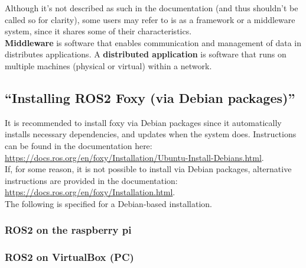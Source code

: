 \documentclass[a4paper, 10pt]{article}
\begin{document}
        Although it’s not described as such in the documentation (and thus shouldn’t be called so for clarity), some users may refer to is as a framework or a middleware system, since it shares some of their characteristics.\\ 
        \textbf{Middleware} is software that enables communication and management of data in distributes applications. A \textbf{distributed application} is software that runs on multiple machines (physical or virtual) within a network. 


        \subsection{``Installing ROS2 Foxy (via Debian packages)''}
        It is recommended to install foxy via Debian packages since it automatically installs necessary dependencies, and updates when the system does. Instructions can be found in the documentation here: \\ \url{https://docs.ros.org/en/foxy/Installation/Ubuntu-Install-Debians.html}. \\

        If, for some reason, it is not possible to install via Debian packages, alternative instructions are provided in the documentation: \\ \url{https://docs.ros.org/en/foxy/Installation.html}.\\ 
        
        The following is specified for a Debian-based installation. \\
		\subsubsection{ROS2 on the raspberry pi}

		\subsubsection{ROS2 on VirtualBox (PC)}
\end{document}
